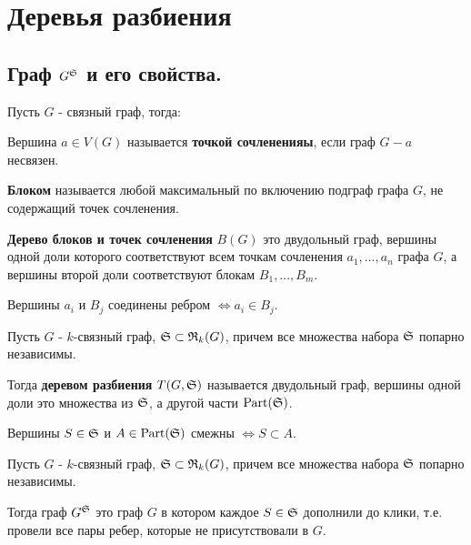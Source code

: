 \newpage

\section{Деревья разбиения}

\subsection{Граф $G^{\S}$ и его свойства.}

Пусть $G$ - связный граф, тогда:

\begin{df*}
	Вершина $a \in V(G)$ называется \textbf{точкой сочлененияы}, если граф  $G - a$ несвязен.
\end{df*}

\begin{df*}[Блок]
	\textbf{Блоком} называется любой максимальный по включению подграф графа $G$, не содержащий точек сочленения.
\end{df*}

\begin{df*}
	\textbf{Дерево блоков и точек сочленения} $B(G)$ это двудольный граф, вершины одной доли которого соответствуют всем точкам сочленения  $a_1, \ldots, a_n$ графа $G$, а вершины второй доли соответствуют блокам  $B_1, \ldots, B_m$.

	Вершины  $a_i$ и  $B_j$ соединены ребром  $\iff a_i \in B_j$.
\end{df*}

\begin{df*} \label{definition:tree_of_partition}
	Пусть $G$ - $k$-связный граф, $\S \subset \R_k(G)$, причем все множества набора $\S$ попарно независимы.

	Тогда \textbf{деревом разбиения} $T(G, \S)$ называется двудольный граф, вершины одной доли это множества из $\S$, а другой части $\Part(\S)$.

	Вершины $S \in \S$ и $A \in \Part(\S)$ смежны $\iff S \subset A$.
\end{df*}

\begin{df*}[$G^{\S}$]
	Пусть $G$ - $k$-связный граф, $\S \subset \R_k(G)$, причем все множества набора $\S$ попарно независимы.

	Тогда граф $G^\S$ это граф $G$ в котором каждое $S \in \S$ дополнили до клики, т.е. провели все пары ребер, которые не присутствовали в $G$.
\end{df*}

